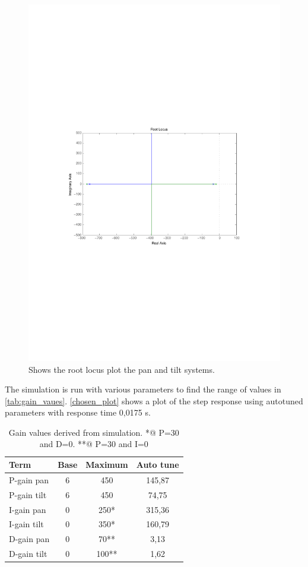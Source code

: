 \begin{figure}[htb]
	\centering
	\includegraphics[width=\textwidth,trim=0 270 0 270]{graphics/rlocus_plot.pdf} %
	\caption{Shows the root locus plot the pan and tilt systems.}
	\label{fig:rlocus_plot}			
\end{figure}

The simulation is run with various parameters to find the range of values in \ref{tab:gain_vaues}. \ref{chosen_plot} shows a plot of the step response using autotuned parameters with response time 0,0175 s.

\begin{table}[htb]				
	\centering
	\begin{tabular}{lccc}			
	Term & Base & Maximum & Auto tune \\			
	\midrule												
P-gain pan& 6 & 450 & 145,87\\
P-gain tilt& 6 & 450 & 74,75 \\
I-gain pan& 0 & 250* & 315,36  \\
I-gain tilt& 0 & 350* & 160,79 \\
D-gain pan& 0 & 70** & 3,13 \\
D-gain tilt& 0 & 100** & 1,62\\
	\end{tabular}
	\caption{Gain values derived from simulation. *@ P=30 and D=0. **@ P=30 and I=0}				
	\label{tab:gain_values}			
\end{table}

